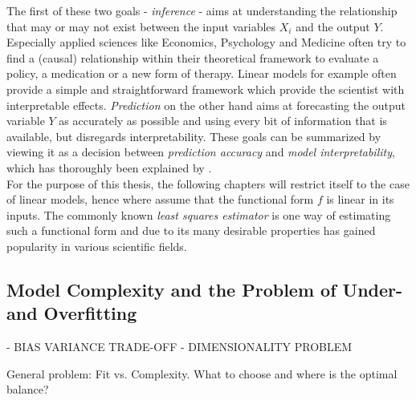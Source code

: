 \documentclass[12pt,a4paper]{article}
\newenvironment{lightbluebox}{%
    \begin{tcolorbox}[colback=lightblue, colframe=lightblue, fontupper=\itshape]%
}{%
    \end{tcolorbox}%
}
\begin{document}
The first of these two goals - \textit{inference} - aims at understanding the relationship that may or may not exist between the input variables $X_i$ and the output $Y$. Especially applied sciences like Economics, Psychology and Medicine often try to find a (causal) relationship within their theoretical framework to evaluate a policy, a medication or a new form of therapy. Linear models for example often provide a simple and straightforward framework which provide the scientist with interpretable effects. \textit{Prediction} on the other hand aims at forecasting the output variable $Y$ as accurately as possible and using every bit of information that is available, but disregards interpretability. \parencite[21]{ESL2009} These goals can be summarized by viewing it as a decision between \textit{prediction accuracy} and \textit{model interpretability}, which has thoroughly been explained by \textcite{ESL2009}.\\

For the purpose of this thesis, the following chapters will restrict itself to the case of linear models, hence where assume that the functional form $f$ is linear in its inputs. The commonly known \textit{least squares estimator} is one way of estimating such a functional form and due to its many desirable properties has gained popularity in various  scientific fields. 

\subsection{Model Complexity and the Problem of Under- and Overfitting}

\begin{lightbluebox}
- BIAS VARIANCE TRADE-OFF
- DIMENSIONALITY PROBLEM

General problem: Fit vs. Complexity. What to choose and where is the optimal balance?
\end{lightbluebox}
\end{document}
